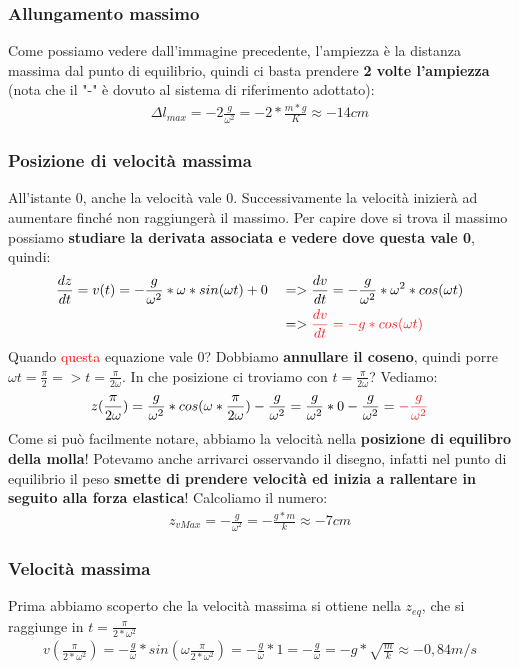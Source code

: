         \subsubsection{Allungamento massimo}
            Come possiamo vedere dall'immagine precedente, l'ampiezza è la distanza massima dal punto di equilibrio, quindi ci basta prendere \textbf{2 volte l'ampiezza} (nota che il "-" è dovuto al sistema di riferimento adottato):
            \begin{align*}
                \Delta l_{max}=-2\frac{g}{\omega^2}=-2*\frac{m*g}{K}\approx-14cm
            \end{align*}

        \subsubsection{Posizione di velocità massima}
            All'istante 0, anche la velocità vale 0. Successivamente la velocità inizierà ad aumentare finché non raggiungerà il massimo. Per capire dove si trova il massimo possiamo \textbf{studiare la derivata associata e vedere dove questa vale 0}, quindi:
            \begin{align*}
                &\frac{dz}{dt}=v(t)=-\frac{g}{\omega^2}*\omega*sin(\omega t)+ 0 &&=>\frac{dv}{dt}=-\frac{g}{\omega^2}*\omega^2*cos(\omega t)\\
                & &&=>\textcolor{Red}{\frac{dv}{dt}=-g*cos(\omega t)}
            \end{align*}
            Quando \textcolor{Red}{questa} equazione vale 0? Dobbiamo \textbf{annullare il coseno}, quindi porre $\omega t = \frac{\pi}{2}=>t=\frac{\pi}{2\omega}$. In che posizione ci troviamo con $t=\frac{\pi}{2\omega}$? Vediamo:
            \begin{align*}
                z(\frac{\pi}{2\omega})=\frac{g}{\omega^2}*cos(\omega * \frac{\pi}{2\omega})-\frac{g}{\omega^2} = \frac{g}{\omega^2}*0-\frac{g}{\omega^2} = \textcolor{Red}{-\frac{g}{\omega^2}}
            \end{align*}
            Come si può facilmente notare, abbiamo la velocità nella \textbf{posizione di equilibro della molla}! Potevamo anche arrivarci osservando il disegno, infatti nel punto di equilibrio il peso \textbf{smette di prendere velocità ed inizia a rallentare in seguito alla forza elastica}! Calcoliamo il numero:
            \begin{align*}
                z_{vMax}=-\frac{g}{\omega^2} = -\frac{g*m}{k}\approx -7cm
            \end{align*}

        \subsubsection{Velocità massima}
            Prima abbiamo scoperto che la velocità massima si ottiene nella $z_{eq}$, che si raggiunge in $t=\frac{\pi}{2*\omega^2}$
            \begin{align*}
                v(\frac{\pi}{2*\omega^2})=-\frac{g}{\omega}*sin(\omega \frac{\pi}{2*\omega^2})=-\frac{g}{\omega}*1 = -\frac{g}{\omega} = -g*\sqrt{\frac{m}{k}}\approx-0,84m/s
            \end{align*}
